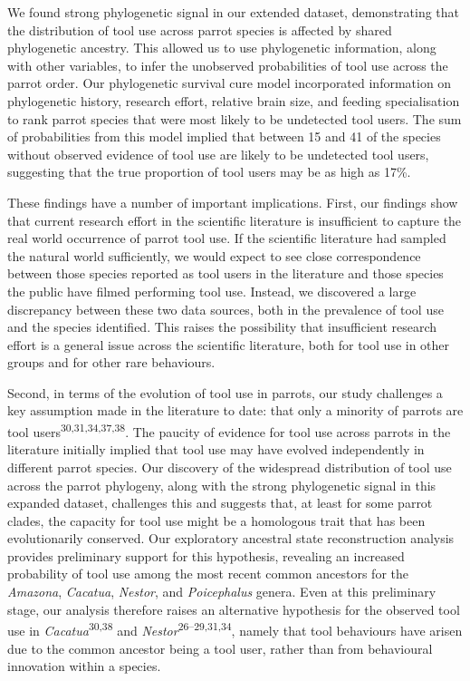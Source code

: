 \documentclass[
  man,floatsintext]{apa6}
\begin{document}
We found strong phylogenetic signal in our extended dataset, demonstrating that the distribution of tool use across parrot species is affected by shared phylogenetic ancestry. This allowed us to use phylogenetic information, along with other variables, to infer the unobserved probabilities of tool use across the parrot order. Our phylogenetic survival cure model incorporated information on phylogenetic history, research effort, relative brain size, and feeding specialisation to rank parrot species that were most likely to be undetected tool users. The sum of probabilities from this model implied that between 15 and 41 of the species without observed evidence of tool use are likely to be undetected tool users, suggesting that the true proportion of tool users may be as high as 17\%.

These findings have a number of important implications. First, our findings show that current research effort in the scientific literature is insufficient to capture the real world occurrence of parrot tool use. If the scientific literature had sampled the natural world sufficiently, we would expect to see close correspondence between those species reported as tool users in the literature and those species the public have filmed performing tool use. Instead, we discovered a large discrepancy between these two data sources, both in the prevalence of tool use and the species identified. This raises the possibility that insufficient research effort is a general issue across the scientific literature, both for tool use in other groups and for other rare behaviours.

Second, in terms of the evolution of tool use in parrots, our study challenges a key assumption made in the literature to date: that only a minority of parrots are tool users\textsuperscript{30,31,34,37,38}. The paucity of evidence for tool use across parrots in the literature initially implied that tool use may have evolved independently in different parrot species. Our discovery of the widespread distribution of tool use across the parrot phylogeny, along with the strong phylogenetic signal in this expanded dataset, challenges this and suggests that, at least for some parrot clades, the capacity for tool use might be a homologous trait that has been evolutionarily conserved. Our exploratory ancestral state reconstruction analysis provides preliminary support for this hypothesis, revealing an increased probability of tool use among the most recent common ancestors for the \emph{Amazona}, \emph{Cacatua}, \emph{Nestor}, and \emph{Poicephalus} genera. Even at this preliminary stage, our analysis therefore raises an alternative hypothesis for the observed tool use in \emph{Cacatua}\textsuperscript{30,38} and \emph{Nestor}\textsuperscript{26--29,31,34}, namely that tool behaviours have arisen due to the common ancestor being a tool user, rather than from behavioural innovation within a species.
\end{document}
